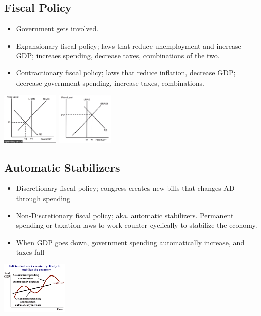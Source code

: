 \documentclass[8pt]{beamer}
\begin{document}
  \begin{frame}
	\section{Fiscal Policy}
	\begin{itemize}
		\item Government gets involved.
		\item Expansionary fiscal policy; laws that reduce unemployment and
		increase GDP; increaes spending, decrease taxes, combinations of the two.
		\item Contractionary fiscal policy; laws that reduce inflation, decrease GDP;
		decrease government spending, increase taxes, combinations.
	\end{itemize}
	\includegraphics[height=2.5cm]{2021-10-12-12-51-33.png}
	\includegraphics[height=2.5cm]{2021-10-12-12-51-48.png}
  \end{frame}
  \begin{frame}
	\section{Automatic Stabilizers}
	\begin{itemize}
		\item Discretionary fiscal policy; congress creates new bills that changes
		AD through spending
		\item Non-Discretionary fiscal policy; aka. automatic stabilizers.
		Permanent spending or taxation laws to work counter cyclically to
		stabilize the economy.
		\item When GDP goes down, government spending automatically increase, and taxes fall
	\end{itemize}
	\includegraphics[height=2.5cm]{2021-10-12-12-56-27.png}
  \end{frame}
\end{document}
